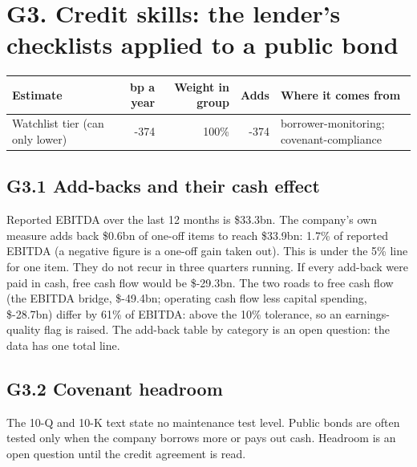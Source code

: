 \documentclass[11pt,a4paper]{article}
\begin{document}
\section*{G3. Credit skills: the lender's checklists applied to a public bond}
\par\noindent{}
\begin{center}\footnotesize\setlength{\tabcolsep}{3.5pt}\begin{tabular}{@{}p{6.2cm}rrrp{4.2cm}@{}}\toprule
Estimate & bp a year & Weight in group & Adds & Where it comes from \\\midrule
Watchlist tier (can only lower) & -374 & 100\% & -374 & borrower-monitoring; covenant-compliance \\
\bottomrule\end{tabular}\end{center}
\subsection*{G3.1 Add-backs and their cash effect}
Reported EBITDA over the last 12 months is \$33.3bn. The company's own measure adds back \$0.6bn of one-off items to reach \$33.9bn: 1.7\% of reported EBITDA (a negative figure is a one-off gain taken out). This is under the 5\% line for one item. They do not recur in three quarters running. If every add-back were paid in cash, free cash flow would be \$-29.3bn. The two roads to free cash flow (the EBITDA bridge, \$-49.4bn; operating cash flow less capital spending, \$-28.7bn) differ by 61\% of EBITDA: above the 10\% tolerance, so an earnings-quality flag is raised. The add-back table by category is an open question: the data has one total line.
\subsection*{G3.2 Covenant headroom}
The 10-Q and 10-K text state no maintenance test level. Public bonds are often tested only when the company borrows more or pays out cash. Headroom is an open question until the credit agreement is read.
\end{document}
